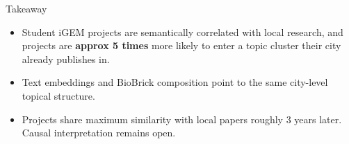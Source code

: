 \documentclass[10pt,aspectratio=169]{beamer}
\begin{document}
\begin{frame}{Takeaway}
\begin{block}{}
  \begin{itemize}
    \item Student iGEM projects are semantically correlated with local research, and projects are \textbf{approx 5 times} more likely to enter a topic cluster their city already publishes in.
    \item Text embeddings and BioBrick composition point to the same city-level topical structure.
    \item Projects share maximum similarity with local papers roughly 3 years later. Causal interpretation remains open.
  \end{itemize}
\end{block}
\end{frame}
\end{document}

